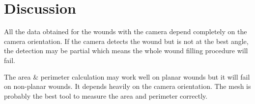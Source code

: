 \section{Discussion}
\label{sec:system_validation_discussion}

{\color{red} All the data obtained for the wounds with the camera depend completely on the camera orientation. If the camera detects the wound but is not at the best angle, the detection may be partial which means the whole wound filling procedure will fail.}

{\color{red} The area & perimeter calculation may work well on planar wounds but it will fail on non-planar wounds. It depends heavily on the camera orientation. The mesh is probably the best tool to measure the area and perimeter correctly.}

